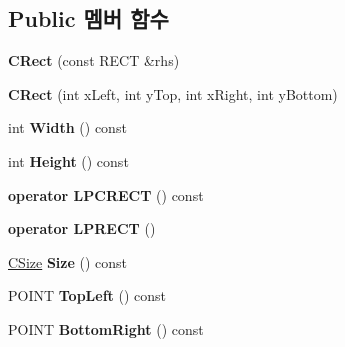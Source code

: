 \subsection*{Public 멤버 함수}
\begin{DoxyCompactItemize}
\item 
\mbox{\label{class_win_helper_1_1_c_rect_aae968ffaab6da35e85e7fa0e8941aea7}} 
{\bfseries C\+Rect} (const R\+E\+CT \&rhs)
\item 
\mbox{\label{class_win_helper_1_1_c_rect_a3253ffe9a6b650c58100509712805d30}} 
{\bfseries C\+Rect} (int x\+Left, int y\+Top, int x\+Right, int y\+Bottom)
\item 
\mbox{\label{class_win_helper_1_1_c_rect_acde8c61514d7814ab1d7c5f91e549a80}} 
int {\bfseries Width} () const
\item 
\mbox{\label{class_win_helper_1_1_c_rect_a227070170fb6da9f8539eb9d35749745}} 
int {\bfseries Height} () const
\item 
\mbox{\label{class_win_helper_1_1_c_rect_a744e3b6f0a33e7143dbe852d71190875}} 
{\bfseries operator L\+P\+C\+R\+E\+CT} () const
\item 
\mbox{\label{class_win_helper_1_1_c_rect_af8af272cf417faeddfba92f44a8b6cb9}} 
{\bfseries operator L\+P\+R\+E\+CT} ()
\item 
\mbox{\label{class_win_helper_1_1_c_rect_a37d2e20ba4edaf4f3ab837862ba73c11}} 
\mbox{\hyperlink{class_win_helper_1_1_c_size}{C\+Size}} {\bfseries Size} () const
\item 
\mbox{\label{class_win_helper_1_1_c_rect_abb394a1600f994a4500c71a48db1b9ad}} 
P\+O\+I\+NT {\bfseries Top\+Left} () const
\item 
\mbox{\label{class_win_helper_1_1_c_rect_a5484884c667466060e54d20f566376a6}} 
P\+O\+I\+NT {\bfseries Bottom\+Right} () const
\item 
\mbox{\label{class_win_helper_1_1_c_rect_a5cc306b936afd8a1fe8321a7846ad260}} 

\end{DoxyCompactItemize}

